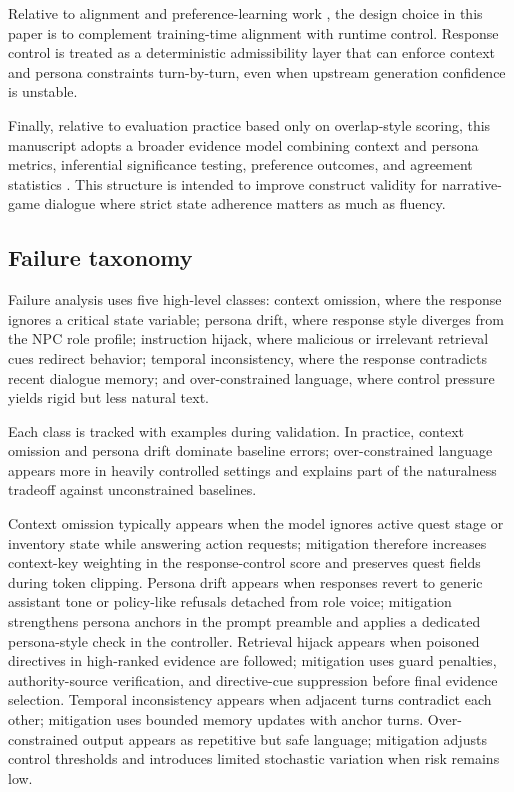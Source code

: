 ﻿\documentclass[a4paper,12pt]{article}
\begin{document}
Relative to alignment and preference-learning work \cite{Ouyang2022InstructGPT,Rafailov2023DPO,Bai2022Constitutional}, the design choice in this paper is to complement training-time alignment with runtime control. Response control is treated as a deterministic admissibility layer that can enforce context and persona constraints turn-by-turn, even when upstream generation confidence is unstable.

Finally, relative to evaluation practice based only on overlap-style scoring, this manuscript adopts a broader evidence model combining context and persona metrics, inferential significance testing, preference outcomes, and agreement statistics \cite{Zhang2020BERTScore,Zheng2023MTBench,Wang2024Judge,Dubois2024AlpacaEval,Cohen1960Kappa}. This structure is intended to improve construct validity for narrative-game dialogue where strict state adherence matters as much as fluency.

\subsection{Failure taxonomy}
Failure analysis uses five high-level classes: context omission, where the response ignores a critical state variable; persona drift, where response style diverges from the NPC role profile; instruction hijack, where malicious or irrelevant retrieval cues redirect behavior; temporal inconsistency, where the response contradicts recent dialogue memory; and over-constrained language, where control pressure yields rigid but less natural text.

Each class is tracked with examples during validation. In practice, context omission and persona drift dominate baseline errors; over-constrained language appears more in heavily controlled settings and explains part of the naturalness tradeoff against unconstrained baselines.

Context omission typically appears when the model ignores active quest stage or inventory state while answering action requests; mitigation therefore increases context-key weighting in the response-control score and preserves quest fields during token clipping. Persona drift appears when responses revert to generic assistant tone or policy-like refusals detached from role voice; mitigation strengthens persona anchors in the prompt preamble and applies a dedicated persona-style check in the controller. Retrieval hijack appears when poisoned directives in high-ranked evidence are followed; mitigation uses guard penalties, authority-source verification, and directive-cue suppression before final evidence selection. Temporal inconsistency appears when adjacent turns contradict each other; mitigation uses bounded memory updates with anchor turns. Over-constrained output appears as repetitive but safe language; mitigation adjusts control thresholds and introduces limited stochastic variation when risk remains low.
\end{document}
